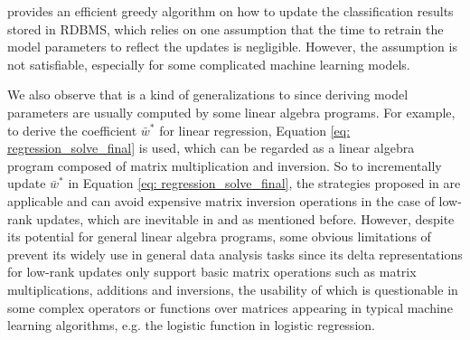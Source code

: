 \cite{koc2011incrementally} provides an efficient greedy algorithm on how to update the classification results stored in RDBMS, which relies on one assumption that the time to retrain the model parameters to reflect the updates is negligible. However, the assumption is not satisfiable, especially for some complicated machine learning models. 


We also observe that \cite{nikolic2014linview} is a kind of generalizations to \cite{deshpande2006mauvedb, gupta2015processing} since deriving model parameters are usually computed by some linear algebra programs. For example, to derive the coefficient $\bar{w}^*$ for linear regression, Equation \ref{eq: regression_solve_final} is used, which can be regarded as a linear algebra program composed of matrix multiplication and inversion. So to incrementally update $\bar{w}^*$ in Equation \ref{eq: regression_solve_final}, the strategies proposed in \cite{nikolic2014linview} are applicable and can avoid expensive matrix inversion operations in the case of low-rank updates, which are inevitable in \cite{deshpande2006mauvedb} and \cite{gupta2015processing} as mentioned before. However, despite its potential for general linear algebra programs, some obvious limitations of \cite{nikolic2014linview} prevent its widely use in general data analysis tasks since its delta representations for low-rank updates only support basic matrix operations such as matrix multiplications, additions and inversions, the usability of which is questionable in some complex operators or functions over matrices appearing in typical machine learning algorithms, e.g. the logistic function in logistic regression.